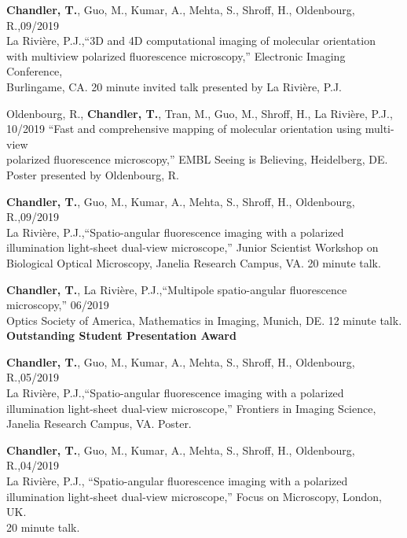 \documentclass[12pt,letterpaper]{article}
\begin{document}
\begin{benumerate}{11}
\item {\textbf{Chandler, T.}, Guo, M., Kumar, A., Mehta, S., Shroff, H., Oldenbourg, R.,\hfill 09/2019\\ La Rivi\`ere, P.J.,``3D and 4D computational imaging of molecular orientation\\ with multiview polarized fluorescence microscopy,'' Electronic Imaging Conference,\\ Burlingame, CA. 20 minute invited talk presented by La Rivi\`ere, P.J.}

\item {Oldenbourg, R., \textbf{Chandler, T.}, Tran, M., Guo, M., Shroff, H., La Rivi\`ere, P.J., \hfill 10/2019 ``Fast and comprehensive mapping of molecular orientation using multi-view\\polarized fluorescence microscopy,'' EMBL Seeing is Believing, Heidelberg, DE.\\ Poster presented by Oldenbourg, R.}
  
\item {\textbf{Chandler, T.}, Guo, M., Kumar, A., Mehta, S., Shroff, H., Oldenbourg, R.,\hfill 09/2019\\ La Rivi\`ere, P.J.,``Spatio-angular fluorescence imaging with a polarized\\ illumination light-sheet dual-view microscope,'' Junior Scientist Workshop on\\ Biological Optical Microscopy, Janelia Research Campus, VA. 20 minute talk.}
  
\item {\textbf{Chandler, T.}, La Rivi\`ere, P.J.,``Multipole spatio-angular fluorescence microscopy,'' \hfill 06/2019\\ Optics Society of America, Mathematics in Imaging, Munich, DE. 12 minute talk.\\ \textbf{Outstanding Student Presentation Award}}
  
\item {\textbf{Chandler, T.}, Guo, M., Kumar, A., Mehta, S., Shroff, H., Oldenbourg, R.,\hfill 05/2019\\ La Rivi\`ere, P.J.,``Spatio-angular fluorescence imaging with a polarized\\ illumination light-sheet dual-view microscope,'' Frontiers in Imaging Science,\\ Janelia Research Campus, VA. Poster.}
  
\item {\textbf{Chandler, T.}, Guo, M., Kumar, A., Mehta, S., Shroff, H., Oldenbourg, R.,\hfill 04/2019\\ La Rivi\`ere, P.J., ``Spatio-angular fluorescence imaging with a polarized\\ illumination light-sheet dual-view microscope,'' Focus on Microscopy, London, UK.\\ 20 minute talk.}
  

\end{benumerate}
\end{document}
